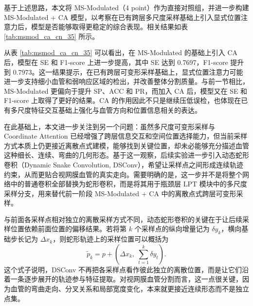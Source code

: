 \documentclass[a4paper,12pt]{article}
\begin{document}
基于上述思路，本文将 MS-Modulated（4 point）作为直接对照组，并进一步构建 MS-Modulated + CA 模型，以考察在已有跨层多尺度采样基础上引入显式位置注意力后，模型是否能够取得更稳定的综合表现。相关结果如表 \ref{tab:msmod_ca_cn_35} 所示。

\begin{table}[htbp]
\centering
\caption{MS-Modulated 与 MS-Modulated + CA 实验结果对比}
\label{tab:msmod_ca_cn_35}
\end{table}

从表 \ref{tab:msmod_ca_cn_35} 可以看出，在 MS-Modulated 的基础上引入 CA 后，模型在 SE 和 F1-score 上进一步提高，其中 SE 达到 0.7697，F1-score 提升到 0.7973。这一结果提示，在已有跨层可变形采样基础上，显式位置注意力可能进一步支持细小血管和弱响应区域的检出，并改善整体分割质量。与前一节相比，MS-Modulated 更偏向于提升 SP、ACC 和 PR，而加入 CA 后，模型又在 SE 和 F1-score 上取得了更好的结果。CA 的作用因此不只是继续压低误检，也体现在已有多尺度特征交互基础上强化与血管方向和位置信息相关的表达。

在此基础上，本文进一步关注到另一个问题：虽然多尺度可变形采样与 Coordinate Attention 已经增强了跨层信息交互和空间位置选择能力，但当前采样方式本质上仍更接近离散点式建模，能够找到关键位置，却未必能够充分描述血管这种细长、连续、弯曲的几何形态。基于这一观察，后续实验进一步引入动态蛇形卷积（Dynamic Snake Convolution, DSConv）\cite{qi2023dsc}，希望让采样点之间形成连续轨迹约束，从而更贴合视网膜血管的真实走向。需要明确的是，这一步并不是将整个网络中的普通卷积全部替换为蛇形卷积，而是将其用于瓶颈层 LPT 模块中的多尺度采样分支，用来替代前一阶段 MS-Modulated + CA 中的离散点式跨层可变形采样。

与前面各采样点相对独立的离散采样方式不同，动态蛇形卷积的关键在于让后续采样位置依赖前面位置的偏移结果。若将第 \(k\) 个采样点的纵向增量记为 \(\delta y_k\)，横向基础步长记为 \(\Delta x_k\)，则蛇形轨迹上的采样位置可以概括为
\[
\tilde{p}_k = p + \left(\Delta x_k,\; \sum_{t=1}^{k}\delta y_t\right).
\]
这个式子说明，DSConv 不再把各采样点看作彼此独立的离散位置，而是让它们沿着一条逐步展开的轨迹参与特征提取。对视网膜血管分割而言，这一点很关键，因为血管的弯曲走向、分叉关系和局部宽度变化，本来就更接近连续形态而不是独立点集。
\end{document}
